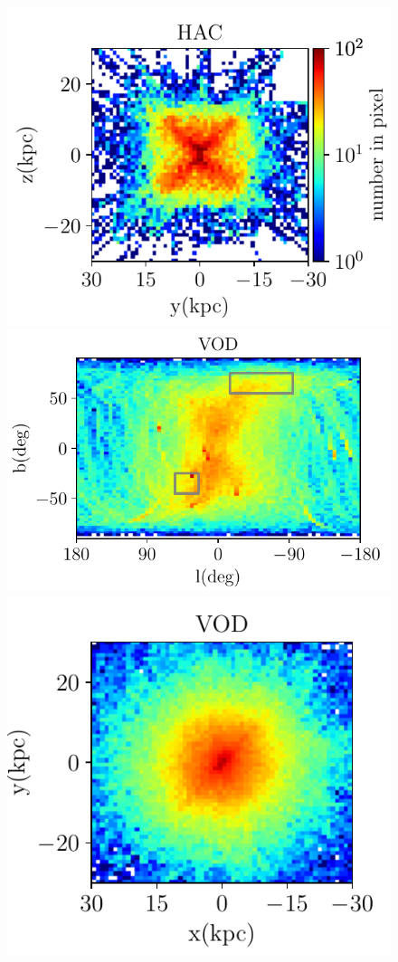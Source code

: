 \documentclass[fleqn,usenatbib]{mnras}
\begin{document}
\begin{figure}
	     	     	     \includegraphics[scale=0.52]{HAC_orbits_8Gyrs_yz_defaultmass.pdf}
	     	     	     	     \includegraphics[scale=0.52]{VOD_orbits_8Gyrs_lb_defaultmass.pdf}
	     	     \includegraphics[scale=0.52]{VOD_orbits_8Gyrs_xy_defaultmass.pdf}

\end{figure}
\end{document}
